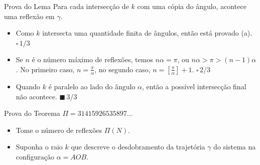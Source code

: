 \documentclass{beamer}
\begin{document}
\begin{frame}{Prova do Lema}
  Para cada intersecção de $k$ com uma cópia do ângulo, acontece uma reflexão em $\gamma$.
  
  \begin{itemize}
    \item Como $k$ intersecta uma quantidade finita de ângulos, então está provado (a). $\square \, 1/3$
    \item Se $n$ é o número máximo de reflexões, temos $n\alpha=\pi$, ou $n\alpha >\pi>(n-1)\alpha$. No primeiro caso, $n = \frac{\pi}{\alpha}$, no segundo caso, $n = [\frac{\pi}{\alpha}]+1$. $\square \, 2/3$
    \item Quando $k$ é paralelo ao lado do ângulo $\alpha$, então a possível intersecção final não acontece. $\blacksquare \, 3/3$
  \end{itemize}

\end{frame}

\begin{frame}{Prova do Teorema $\Pi=31415926535897\dots$}
    \begin{itemize}
      \item Tome o número de reflexões $\Pi(N)$.
      \item Suponha o raio $k$ que descreve o desdobramento da trajetória $\gamma$ do sistema na configuração $\alpha = AOB$.
    \end{itemize}
\end{frame}
\end{document}
